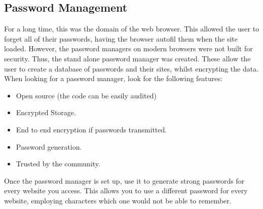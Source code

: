 		\subsection{Password Management}
			For a long time, this was the domain of the web browser.
			This allowed the user to forget all of their passwords, having the browser autofil them when the site loaded.
			However, the password managers on modern browsers were not built for security.
			Thus, the stand alone password manager was created.
			These allow the user to create a database of passwords and their sites, whilst encrypting the data.
			When looking for a password manager, look for the following features:
			\begin{itemize}
				\item Open source (the code can be easily audited)
				\item Encrypted Storage.
				\item End to end encryption if passwords transmitted.
				\item Password generation.
				\item Trusted by the community.
			\end{itemize}
			Once the password manager is set up, use it to generate strong passwords for every website you access.
			This allows you to use a different password for every website, employing characters which one would not be able to remember.


